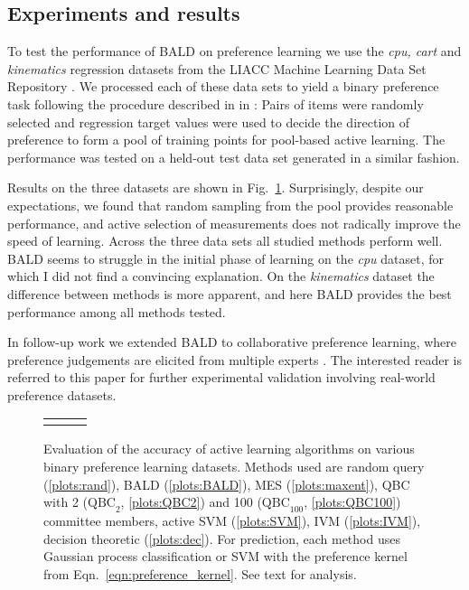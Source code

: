 \subsection{Experiments and results}

To test the performance of BALD on preference learning we use the \emph{cpu, cart} and \emph{kinematics} regression datasets from the LIACC Machine Learning Data Set Repository \citep{LIACCRepository}. We processed each of these data sets to yield a binary preference task following the procedure described in in \cite{Chu2005}: Pairs of items were randomly selected and regression target values were used to decide the direction of preference to form a pool of training points for pool-based active learning. The performance was tested on a held-out test data set generated in a similar fashion.

Results on the three datasets are shown in Fig.\ \ref{fig:BALD_pref_results}.  Surprisingly, despite our expectations, we found that random sampling from the pool provides reasonable performance, and active selection of measurements does not radically improve the speed of learning. Across the three data sets all studied methods perform well. BALD seems to struggle in the initial phase of learning on the \emph{cpu} dataset, for which I did not find a convincing explanation. On the \emph{kinematics} dataset the difference between methods is more apparent, and here BALD provides the best performance among all methods tested.

In follow-up work we extended BALD to collaborative preference learning, where preference judgements are elicited from multiple experts \citep{Houlsby2012preference}. The interested reader is referred to this paper for further experimental validation involving real-world preference datasets.
% 
\begin{figure}
	\begin{center}
	\begin{tabular}{ccc}
	&
	&
	
	\end{tabular}
	\end{center}
	\caption[Evaluation of Bayesian active learning of binary preference relations]{Evaluation of the accuracy of active learning algorithms on various binary preference learning datasets. Methods used are random query (\ref{plots:rand}), BALD (\ref{plots:BALD}),  MES (\ref{plots:maxent}), QBC with 2 ($\mbox{QBC}_2$, \ref{plots:QBC2}) and 100 ($\mbox{QBC}_{100}$, \ref{plots:QBC100}) committee members, active SVM (\ref{plots:SVM}), IVM (\ref{plots:IVM}), decision theoretic \citep{Kapoor2007} (\ref{plots:dec}). For prediction, each method uses Gaussian process classification or SVM with the preference kernel from Eqn.\ \eqref{eqn:preference_kernel}.  See text for analysis. \label{fig:BALD_pref_results}}
\end{figure}

